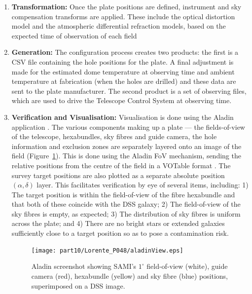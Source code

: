 \begin{enumerate}
\item{\bf Transformation:} Once the plate positions are defined,
  instrument and sky compensation transforms are applied. These
  include the optical distortion model and the atmospheric
  differential refraction models, based on the expected time of
  observation of each field

\item{\bf Generation:} The configuration process creates two products:
  the first is a CSV file containing the hole positions for the plate. A final
  adjustment is made for the estimated dome temperature at observing time
  and ambient temperature at fabrication (when the holes are drilled)
  and these data are sent to the plate manufacturer. The second
  product is a set of observing files, which are used to drive the Telescope
  Control System at observing time.

\item{\bf Verification and Visualisation:} Visualisation is done using
  the Aladin application \citep{2000bfb+}. The various components
  making up a plate --- the fields-of-view of the telescope,
  hexabundles, sky fibres and guide camera, the hole information and
  exclusion zones are separately layered onto an image of the
  field (Figure~\ref{p048_FigAladin}). This is done using the Aladin FoV mechanism, sending the
  relative positions from the centre of the field in a VOTable
  format \citep{2011owd+}. The survey target positions are also plotted as a separate
  absolute position $(\alpha, \delta)$ layer. This facilitates
  verification by eye of several items, including:
1) The target position is within the field-of-view of the fibre
  hexabundle and that both of these coincide with the DSS galaxy;
2) The field-of-view of the sky fibres is empty, as expected;
3) The distribution of sky fibres is uniform across the plate; and
4) There are no bright stars or extended galaxies sufficiently
  close to a target position so as to pose a contamination risk.

\begin{figure}[ht]
\centering
\texttt{[image: part10/Lorente\_P048/aladinView.eps]}
\caption{Aladin screenshot showing SAMI's $1^\circ$ field-of-view (white),
  guide camera (red), hexabundle (yellow)
  and sky fibre (blue) positions, superimposed on a DSS image.}
\label{p048_FigAladin}
\end{figure}

\end{enumerate}


